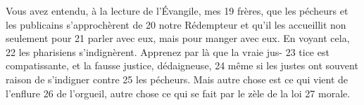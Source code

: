 Vous avez entendu, à la lecture de l'Évangile, mes	 
19	 	frères, que les pécheurs et les publicains s'approchèrent de	 
20	 	notre Rédempteur et qu'il les accueillit non seulement pour	 
21	 	parler avec eux, mais pour manger avec eux. En voyant cela,	 
22	 	les pharisiens s'indignèrent. Apprenez par là que la vraie jus-	 
23	 	tice est compatissante, et la fausse justice, dédaigneuse,	 
24	 	même si les justes ont souvent raison de s'indigner contre	 
25	 	les pécheurs. Mais autre chose est ce qui vient de l'enflure	 
26	 	de l'orgueil, autre chose ce qui se fait par le zèle de la loi	 
27	 	morale.